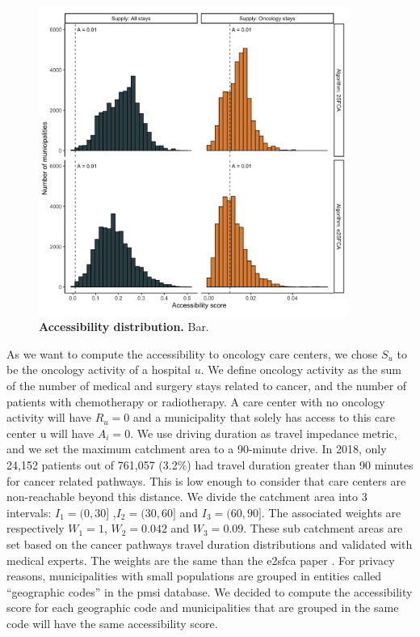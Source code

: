 \begin{figure}[H]
    \includegraphics[width=0.9\textwidth]{images/camion/sup_fig5_accessibility_distribution.png}
    \centering
    \caption{ \textbf{Accessibility distribution.} Bar. }
    \label{fig:accessibility-distribution}
\end{figure}

As we want to compute the accessibility to oncology care centers, we chose $S_u$
to be the oncology activity of a hospital $u$. We define oncology activity as
the sum of the number of medical and surgery stays related to cancer, and the
number of patients with chemotherapy or radiotherapy. A care center with no
oncology activity will have $R_u=0$ and a municipality that solely has access to
this care center u will have $A_i=0$. We use driving duration as travel
impedance metric, and we set the maximum catchment area to a 90-minute drive. In
2018, only 24,152 patients out of 761,057 (3.2\%) had travel duration greater
than 90 minutes for cancer related pathways. This is low enough to consider that
care centers are non-reachable beyond this distance. We divide the catchment
area into 3 intervals: $I_1=(0,30]$ ,$I_2=(30,60]$ and $I_3=(60,90]$. The
associated weights are respectively $W_1=1$, $W_2=0.042$ and $W_3=0.09$. These
sub catchment areas are set based on the cancer pathways travel duration
distributions and validated with medical experts. The weights are the same than
the \ac{e2sfca} paper \cite{luo_enhanced_2009}. For privacy reasons,
municipalities with small populations are grouped in entities called
``geographic codes'' in the \ac{pmsi} database. We decided to compute the
accessibility score for each geographic code and municipalities that are grouped
in the same code will have the same accessibility score.

